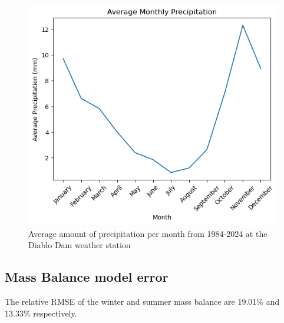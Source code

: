 \documentclass{article}
\begin{document}
\begin{figure}[h]
    \centering
    \includegraphics[width=\textwidth]{Plots/monthly_precip.png}
    \caption{Average amount of precipitation per month from 1984-2024 at the Diablo Dam weather station}
    \label{fig:monthly_precip}
\end{figure}    
\FloatBarrier

\subsection{Mass Balance model error}
The relative RMSE of the winter and summer mass balance are 19.01\% and 13.33\% respectively.
\end{document}
